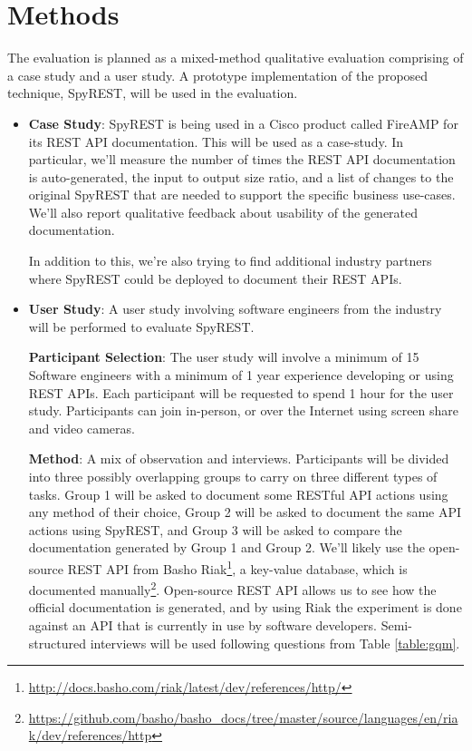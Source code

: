 \documentclass{article}
\begin{document}
\section{Methods}

The evaluation is planned as a mixed-method qualitative evaluation comprising of a case study and a user study. A prototype implementation of the proposed technique, SpyREST, will be used in the evaluation.

\begin{itemize}
  \item \textbf{Case Study}: SpyREST is being used in a Cisco product called FireAMP for its REST API documentation. This will be used as a case-study. In particular, we'll measure the number of times the REST API documentation is auto-generated, the input to output size ratio, and a list of changes to the original SpyREST that are needed to support the specific business use-cases. We'll also report qualitative feedback about usability of the generated documentation.

  In addition to this, we're also trying to find additional industry partners where SpyREST could be deployed to document their REST APIs.

  \item \textbf{User Study}: A user study involving software engineers from the industry will be performed to evaluate SpyREST.

  \textbf{Participant Selection}: The user study will involve a minimum of 15 Software engineers with a minimum of 1 year experience developing or using REST APIs. Each participant will be requested to spend 1 hour for the user study. Participants can join in-person, or over the Internet using screen share and video cameras.

  \textbf{Method}: A mix of observation and interviews. Participants will be divided into three possibly overlapping groups to carry on three different types of tasks. Group 1 will be asked to document some RESTful API actions using any method of their choice, Group 2 will be asked to document the same API actions using SpyREST, and Group 3 will be asked to compare the documentation generated by Group 1 and Group 2. We'll likely use the open-source REST API from Basho Riak\footnote{\url{http://docs.basho.com/riak/latest/dev/references/http/}}, a key-value database, which is documented manually\footnote{\url{https://github.com/basho/basho_docs/tree/master/source/languages/en/riak/dev/references/http}}. Open-source REST API allows us to see how the official documentation is generated, and by using Riak the experiment is done against an API that is currently in use by software developers. Semi-structured interviews will be used following questions from Table \ref{table:gqm}.


\end{itemize}
\end{document}
